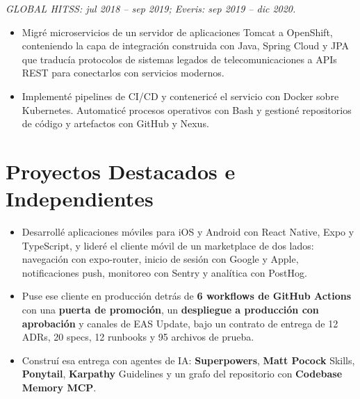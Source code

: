 {
\textit{GLOBAL HITSS: jul 2018 -- sep 2019; Everis: sep 2019 -- dic 2020.}\par\vspace{3pt}
\begin{itemize}
    \item Migré microservicios de un servidor de aplicaciones Tomcat a OpenShift, conteniendo la capa de integración construida con Java, Spring Cloud y JPA que traducía protocolos de sistemas legados de telecomunicaciones a APIs REST para conectarlos con servicios modernos.
    \item Implementé pipelines de CI/CD y contenericé el servicio con Docker sobre Kubernetes. Automaticé procesos operativos con Bash y gestioné repositorios de código y artefactos con GitHub y Nexus.
\end{itemize}

\section*{Proyectos Destacados e Independientes}

\begin{itemize}
    \item Desarrollé aplicaciones móviles para iOS y Android con React Native, Expo y TypeScript, y lideré el cliente móvil de un marketplace de dos lados: navegación con expo-router, inicio de sesión con Google y Apple, notificaciones push, monitoreo con Sentry y analítica con PostHog.
    \item Puse ese cliente en producción detrás de \textbf{6 workflows de GitHub Actions} con una \textbf{puerta de promoción}, un \textbf{despliegue a producción con aprobación} y canales de EAS Update, bajo un contrato de entrega de 12 ADRs, 20 specs, 12 runbooks y 95 archivos de prueba.
    \item Construí esa entrega con agentes de IA: \textbf{Superpowers}, \textbf{Matt Pocock} Skills, \textbf{Ponytail}, \textbf{Karpathy} Guidelines y un grafo del repositorio con \textbf{Codebase Memory MCP}.
\end{itemize}

}
